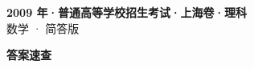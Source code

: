 \documentclass[zihao=-4, a4paper]{ctexart}
\begin{document}
\begin{center}
  {\Large\bfseries 2009 年·普通高等学校招生考试·上海卷·理科}\\[4pt]
  {\large 数学 · 简答版}
\end{center}
\medskip
{}

\clearpage
{}
\begin{center}{\Large\bfseries 答案速查}\end{center}
\medskip

\end{document}
